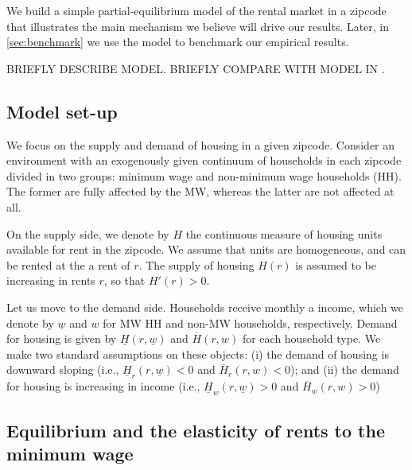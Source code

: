 
We build a simple partial-equilibrium model of the rental market in a zipcode that illustrates 
the main mechanism we believe will drive our results. Later, in \autoref{sec:benchmark} we 
use the model to benchmark our empirical results.

BRIEFLY DESCRIBE MODEL. BRIEFLY COMPARE WITH MODEL IN \textcite{Yamagishi2020}.


\subsection{Model set-up}

We focus on the supply and demand of housing in a given zipcode. Consider an environment with 
an exogenously given continuum of households in each zipcode divided in two groups: minimum wage 
and non-minimum wage households (HH). The former are fully affected by the MW, whereas the latter 
are not affected at all.

On the supply side, we denote by $H$ the continuous measure of housing units available for rent 
in the zipcode. We assume that units are homogeneous, and can be rented at the a rent of $r$. The 
supply of housing $H(r)$ is assumed to be increasing in rents $r$, so that $H'(r) > 0$.

Let us move to the demand side. Households receive monthly a income, which we denote by 
$\underline{w}$ and $w$ for MW HH and non-MW households, respectively. Demand for housing is given 
by $\underline{H}(r, \underline{w})$ and $\overline{H}(r, w)$ for each household type. We make two 
standard assumptions on these objects: (i) the demand of housing is downward sloping (i.e., 
$\underline{H}_r(r, \underline{w}) < 0$ and $\overline{H}_r(r, w) < 0$); and (ii) the demand for 
housing is increasing in income (i.e., $\underline{H}_w(r, \underline{w}) > 0$ and $\overline{H}_w(r, 
w) > 0$)


\subsection{Equilibrium and the elasticity of rents to the minimum wage}

